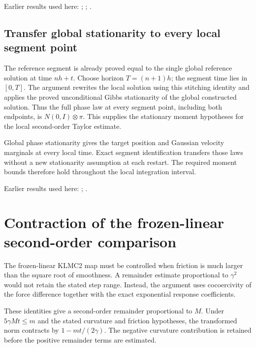 \documentclass[11pt,a4paper]{report}
\begin{document}
Earlier results used here: \cite[Section~3.13.2]{LangevinLean2026ULASC}; \cite[Section~3.13.5]{LangevinLean2026ULASC}; \cite[Section~3.17.1]{LangevinLean2026ULASC}.
\subsection{\texorpdfstring{Transfer global stationarity to every local segment point}{Transfer global stationarity to every local segment point}}
\label{report-step-KineticLangevin-CanonicalSecondOrderSegments-lean-3}


The reference segment is already proved equal to the single global reference solution at time \(nh+t\). Choose horizon \(T=(n+1)h\); the segment time lies in \([0,T]\). The argument rewrites the local solution using this stitching identity and applies the proved unconditional Gibbs stationarity of the global constructed solution. Thus the full phase law at every segment point, including both endpoints, is \(N(0,I)\otimes\pi\). This supplies the stationary moment hypotheses for the local second-order Taylor estimate.



Global phase stationarity gives the target position and Gaussian velocity marginals at every local time. Exact segment identification transfers those laws without a new stationarity assumption at each restart. The required moment bounds therefore hold throughout the local integration interval.



Earlier results used here: \cite[Section~3.17.1]{LangevinLean2026ULASC}; \cite[Section~3.26.3]{LangevinLean2026ULASC}.
\section{\texorpdfstring{Contraction of the frozen-linear second-order comparison}{Contraction of the frozen-linear second-order comparison}}
\label{proof-module-KineticLangevin-SecondOrderLinear-lean}


The frozen-linear KLMC2 map must be controlled when friction is much larger than the square root of smoothness. A remainder estimate proportional to \(\gamma^2\) would not retain the stated step range. Instead, the argument uses cocoercivity of the force difference together with the exact exponential response coefficients.



These identities give a second-order remainder proportional to \(M\). Under \(5\gamma Mt\le m\) and the stated curvature and friction hypotheses, the transformed norm contracts by \(1-mt/(2\gamma)\). The negative curvature contribution is retained before the positive remainder terms are estimated.
\end{document}
